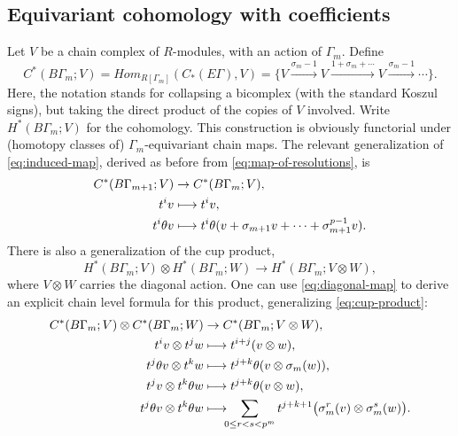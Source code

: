 \documentclass[10pt,a4paper]{amsart}
\newcommand\mto{\mathchoice{\longmapsto}{\mapsto}{\mapsto}{\mapsto}}
\theoremstyle{plain}
\theoremstyle{definition}
\begin{document}
\subsection{Equivariant cohomology with coefficients}
Let $V$ be a chain complex of $R$-modules, with an action of $\Gamma_m$. Define
\begin{equation}\label{eq:v-coefficients}
C^*(B\Gamma_m;V) \!=\! \mathit{Hom}_{R[\Gamma_m]}(C_*(E\Gamma),V) \!=\! \bigl\{ V \xrightarrow{\sigma_m - 1} V \xrightarrow{1+\sigma_m + \cdots} V \xrightarrow{\sigma_m - 1} \cdots \bigr\}.
\end{equation}
Here, the notation stands for collapsing a bicomplex (with the standard Koszul signs), but taking the direct product of the copies of $V$ involved. Write $H^*(B\Gamma_m;V)$ for the cohomology. This construction is obviously functorial under (homotopy classes of) $\Gamma_m$-equivariant chain maps. The relevant generalization of \eqref{eq:induced-map}, derived as before from \eqref{eq:map-of-resolutions}, is
\begin{equation}\label{eq:induced-map-with-coefficients}
\begin{aligned}
C^*(B\Gamma_{m+1};V) &\to C^*(B\Gamma_m;V), \\
t^i v &\mto t^i v, \\
t^i\theta v &\mto t^i\theta (v + \sigma_{m+1} v + \cdots + \sigma_{m+1}^{p-1} v).
\end{aligned}
\end{equation}
There is also a generalization of the cup product,
\begin{equation*}
H^*(B\Gamma_m;V) \otimes H^*(B\Gamma_m;W) \to H^*(B\Gamma_m;V \otimes W),
\end{equation*}
where $V \otimes W$ carries the diagonal action. One can use \eqref{eq:diagonal-map} to derive an explicit chain level formula for this product, generalizing \eqref{eq:cup-product}:
\begin{equation}\label{eq:chain-cup-product-with-coefficients}
\begin{aligned}
C^*(B\Gamma_m;V) \otimes C^*(B\Gamma_m;W) &\to C^*(B\Gamma_m;V \otimes W), \\
t^i v \otimes t^j w &\mto t^{i+j} (v \otimes w), \\
t^j\theta v \otimes t^k w &\mto t^{j+k}\theta (v \otimes \sigma_m(w)), \\
t^j v \otimes t^k\theta w&\mto t^{j+k}\theta (v \otimes w), \\
t^j\theta v \otimes t^k\theta w &\mto \!\!\!\sum_{0 \leq r < s < p^m} t^{j+k+1}\bigl( \sigma_m^r(v) \otimes \sigma_m^s(w) \bigr).
\end{aligned}
\end{equation}
\end{document}
